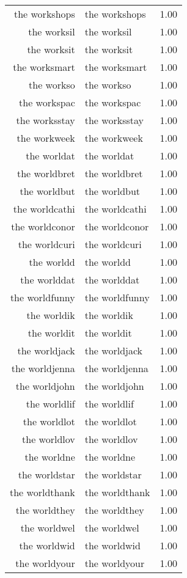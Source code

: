 \begin{table}[ht]
\begin{tabular}{rlr}
  the workshops & the workshops & 1.00 \\ 
  the worksil & the worksil & 1.00 \\ 
  the worksit & the worksit & 1.00 \\ 
  the worksmart & the worksmart & 1.00 \\ 
  the workso & the workso & 1.00 \\ 
  the workspac & the workspac & 1.00 \\ 
  the worksstay & the worksstay & 1.00 \\ 
  the workweek & the workweek & 1.00 \\ 
  the worldat & the worldat & 1.00 \\ 
  the worldbret & the worldbret & 1.00 \\ 
  the worldbut & the worldbut & 1.00 \\ 
  the worldcathi & the worldcathi & 1.00 \\ 
  the worldconor & the worldconor & 1.00 \\ 
  the worldcuri & the worldcuri & 1.00 \\ 
  the worldd & the worldd & 1.00 \\ 
  the worlddat & the worlddat & 1.00 \\ 
  the worldfunny & the worldfunny & 1.00 \\ 
  the worldik & the worldik & 1.00 \\ 
  the worldit & the worldit & 1.00 \\ 
  the worldjack & the worldjack & 1.00 \\ 
  the worldjenna & the worldjenna & 1.00 \\ 
  the worldjohn & the worldjohn & 1.00 \\ 
  the worldlif & the worldlif & 1.00 \\ 
  the worldlot & the worldlot & 1.00 \\ 
  the worldlov & the worldlov & 1.00 \\ 
  the worldne & the worldne & 1.00 \\ 
  the worldstar & the worldstar & 1.00 \\ 
  the worldthank & the worldthank & 1.00 \\ 
  the worldthey & the worldthey & 1.00 \\ 
  the worldwel & the worldwel & 1.00 \\ 
  the worldwid & the worldwid & 1.00 \\ 
  the worldyour & the worldyour & 1.00 \\ 

\end{tabular}
\end{table}
